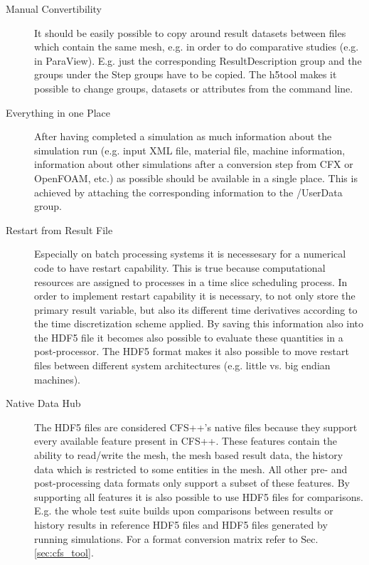 \begin{description}

\item[Manual  Convertibility] It  should  be easily  possible  to copy  around
result datasets between files which contain the same mesh, e.g. in order to do
comparative  studies  (e.g.   in  ParaView).   E.g.   just  the  corresponding
ResultDescription  group and  the  groups under  the  Step groups  have to  be
copied. The h5tool makes it  possible to change groups, datasets or attributes
from the command line.

\item[Everything in  one Place]  After having completed  a simulation  as much
information  about the  simulation run  (e.g. input  XML file,  material file,
machine information,  information about  other simulations after  a conversion
step from CFX  or OpenFOAM, etc.) as possible should be  available in a single
place.  This is  achieved by  attaching the  corresponding information  to the
/UserData group.

\item[Restart from Result  File] Especially on batch processing  systems it is
necessesary  for a numerical  code to  have restart  capability. This  is true
because  computational resources  are assigned  to processes  in a  time slice
scheduling process. In order to  implement restart capability it is necessary,
to not  only store the  primary result variable,  but also its  different time
derivatives according  to the time  discretization scheme applied.   By saving
this information also into the HDF5  file it becomes also possible to evaluate
these quantities in  a post-processor. The HDF5 format  makes it also possible
to  move restart  files between  different system  architectures  (e.g. little
vs. big endian machines).

\item[Native  Data Hub]  The HDF5  files are  considered CFS++'s  native files
because they support every available  feature present in CFS++. These features
contain the  ability to read/write the  mesh, the mesh based  result data, the
history data which is restricted to  some entities in the mesh. All other pre-
and post-processing data  formats only support a subset  of these features. By
supporting  all  features   it  is  also  possible  to   use  HDF5  files  for
comparisons. E.g. the whole test suite builds upon comparisons between results
or history results in reference HDF5 files and HDF5 files generated by running
simulations. For a format conversion matrix refer to Sec. \ref{sec:cfs_tool}.


\end{description}
